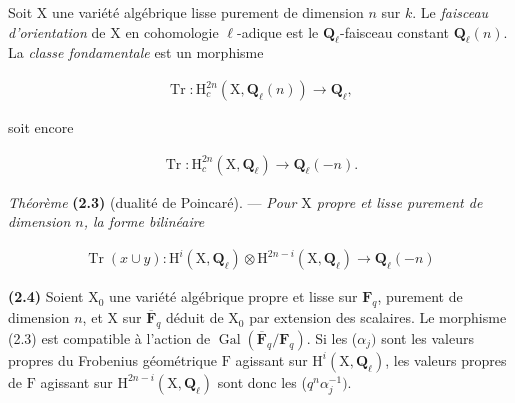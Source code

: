 \documentclass[10pt,leqno]{article}
\begin{document}
\noindent Soit \(\mathrm{X}\) une variété algébrique lisse purement de dimension \(n\) sur \(k\). Le \emph{faisceau d’orientation} de \(\mathrm{X}\) en cohomologie \(\ell \)-adique est le \(\mathbf{Q}_{\ell }\)-faisceau constant \(\mathbf{Q}_{\ell }(n)\). La \emph{classe fondamentale} est un morphisme\par

\begin{equation*}\begin{gathered}\operatorname{Tr} : \mathrm{H}_{c}^{2n}(\mathrm{X},\mathbf{Q}_{\ell }(n)) \longrightarrow  \mathbf{Q}_{\ell },\end{gathered}\end{equation*}

\noindent soit encore\par

\begin{equation*}\begin{gathered}\operatorname{Tr} : \mathrm{H}_{c}^{2n}(\mathrm{X},\mathbf{Q}_{\ell }) \longrightarrow  \mathbf{Q}_{\ell }(- n).\end{gathered}\end{equation*}

\noindent \emph{Théorème} \textbf{(2.3)} (dualité de Poincaré). — {\itshape Pour \(\mathrm{X}\) propre et lisse purement de dimension \(n\), la forme bilinéaire}\par

\begin{equation*}\begin{gathered}\operatorname{Tr}(x\cup y) : \mathrm{H}^{i}(\mathrm{X},\mathbf{Q}_{\ell })\otimes \mathrm{H}^{2n- i}(\mathrm{X},\mathbf{Q}_{\ell }) \longrightarrow  \mathbf{Q}_{\ell }(- n)\end{gathered}\end{equation*}

\par

\noindent \textbf{(2.4)} Soient \(\mathrm{X}_{0}\) une variété algébrique propre et lisse sur \(\mathbf{F}_{q}\), purement de dimension \(n\), et \(\mathrm{X}\) sur \(\overline{\mathbf{F}}_{q}\) déduit de \(\mathrm{X}_{0}\) par extension des scalaires. Le morphisme (2.3) est compatible à l’action de \(\operatorname{Gal}(\overline{\mathbf{F}}_{q}/\mathbf{F}_{q})\). Si les (\(\alpha _{j})\) sont les valeurs propres du Frobenius géométrique \(\mathrm{F}\) agissant sur \(\mathrm{H}^{i}(\mathrm{X},\mathbf{Q}_{\ell })\), les valeurs propres de \(\mathrm{F}\) agissant sur \(\mathrm{H}^{2n- i}(\mathrm{X},\mathbf{Q}_{\ell })\) sont donc les (\(q^{n} \alpha _{j}^{- 1})\).\par
\end{document}
